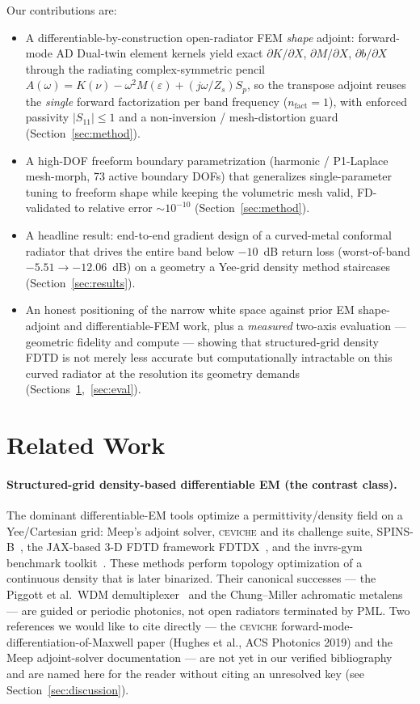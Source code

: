 \documentclass{anvil-paper}
\begin{document}
Our contributions are:
\begin{itemize}
  \item A differentiable-by-construction open-radiator FEM \emph{shape} adjoint:
  forward-mode AD Dual-twin element kernels yield exact
  $\partial K/\partial X$, $\partial M/\partial X$, $\partial b/\partial X$
  through the radiating complex-symmetric pencil
  $A(\omega)=K(\nu)-\omega^2 M(\varepsilon)+(j\omega/Z_s)S_p$, so the transpose
  adjoint reuses the \emph{single} forward factorization per band frequency
  ($n_{\text{fact}}=1$), with enforced passivity $|S_{11}|\le 1$ and a
  non-inversion / mesh-distortion guard (Section~\ref{sec:method}).
  \item A high-DOF freeform boundary parametrization (harmonic / P1-Laplace
  mesh-morph, 73 active boundary DOFs) that generalizes single-parameter tuning
  to freeform shape while keeping the volumetric mesh valid, FD-validated to
  relative error $\sim\!10^{-10}$ (Section~\ref{sec:method}).
  \item A headline result: end-to-end gradient design of a curved-metal
  conformal radiator that drives the entire band below $-10$~dB return loss
  (worst-of-band $-5.51 \to -12.06$~dB) on a geometry a Yee-grid density method
  staircases (Section~\ref{sec:results}).
  \item An honest positioning of the narrow white space against prior EM
  shape-adjoint and differentiable-FEM work, plus a \emph{measured} two-axis
  evaluation --- geometric fidelity and compute --- showing that structured-grid
  density FDTD is not merely less accurate but computationally intractable on
  this curved radiator at the resolution its geometry demands
  (Sections~\ref{sec:related},~\ref{sec:eval}).
\end{itemize}

\section{Related Work}
\label{sec:related}

\paragraph{Structured-grid density-based differentiable EM (the contrast class).}
The dominant differentiable-EM tools optimize a permittivity/density field on a
Yee/Cartesian grid: Meep's adjoint solver, \textsc{ceviche} and its
challenge suite, SPINS-B~\cite{su_spinsb}, the JAX-based 3-D FDTD framework
FDTDX~\cite{fdtdx}, and the invrs-gym benchmark toolkit~\cite{invrsgym}. These
methods perform topology optimization of a continuous density that is later
binarized. Their canonical successes --- the Piggott et al.\ WDM
demultiplexer~\cite{piggott2015} and the Chung--Miller achromatic
metalens~\cite{chung2020} --- are guided or periodic photonics, not open
radiators terminated by PML. Two references we would like to cite directly ---
the \textsc{ceviche} forward-mode-differentiation-of-Maxwell paper (Hughes et
al., ACS Photonics 2019) and the Meep adjoint-solver documentation --- are not
yet in our verified bibliography and are named here for the reader without citing
an unresolved key (see Section~\ref{sec:discussion}).
\end{document}
